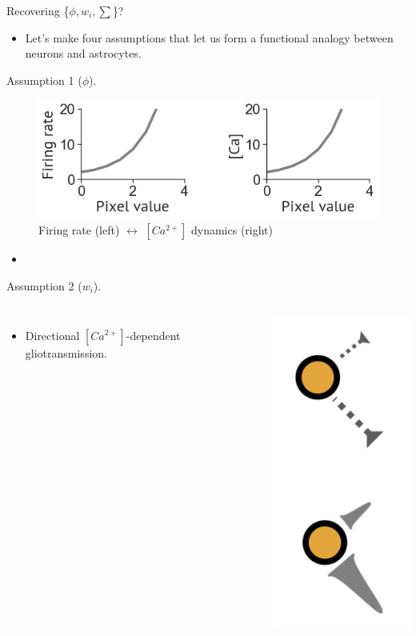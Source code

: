 \documentclass[10pt]{beamer}
\begin{document}
\begin{frame}[fragile]{Recovering \{$\phi, w_i, \sum $\}?}
\begin{itemize}
    \item Let's make four assumptions that let us form a functional analogy between neurons and astrocytes.
\end{itemize}
\end{frame}

\begin{frame}[fragile]{Assumption 1 ($\phi$).}
\begin{figure}
    \centering
    \includegraphics[scale=0.4]{images/phi_ca.png}
    \caption{Firing rate (left) $\leftrightarrow$ $[Ca^{2+}]$ dynamics (right)}
\end{figure}
\begin{itemize}
    \item 
\end{itemize}
\end{frame}

\begin{frame}[fragile]{Assumption 2 ($w_i$).}
\begin{columns}
\begin{itemize}
    \item \alert{Directional} $[Ca^{2+}]$-dependent gliotransmission.
\end{itemize}
    \centering
    \includegraphics[scale=0.4]{images/gliotrans.jpeg}
\end{columns}
\end{frame}
\end{document}
